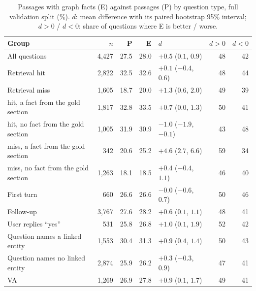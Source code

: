 \begin{table}[ht]
    \centering
    \caption{Passages with graph facts (E) against passages (P) by question type, full
    validation split (\%). $d$: mean difference with its paired bootstrap 95\% interval;
    $d > 0$ / $d < 0$: share of questions where E is better / worse.}
    \label{tab:graphhelp:groups}
    \small
    \begin{tabular}{lrrrlrr}
        \toprule
        Group & $n$ & P & E & $d$ & $d > 0$ & $d < 0$ \\
        \midrule
        All questions                               & 4{,}427 & 27.5 & 28.0 & $+0.5$ ($0.1$, $0.9$)   & 48 & 42 \\
        \midrule
        Retrieval hit                               & 2{,}822 & 32.5 & 32.6 & $+0.1$ ($-0.4$, $0.6$)  & 48 & 44 \\
        Retrieval miss                              & 1{,}605 & 18.7 & 20.0 & $+1.3$ ($0.6$, $2.0$)   & 49 & 39 \\
        \quad hit, a fact from the gold section     & 1{,}817 & 32.8 & 33.5 & $+0.7$ ($0.0$, $1.3$)   & 50 & 41 \\
        \quad hit, no fact from the gold section    & 1{,}005 & 31.9 & 30.9 & $-1.0$ ($-1.9$, $-0.1$) & 43 & 48 \\
        \quad miss, a fact from the gold section    &     342 & 20.6 & 25.2 & $+4.6$ ($2.7$, $6.6$)   & 59 & 34 \\
        \quad miss, no fact from the gold section   & 1{,}263 & 18.1 & 18.5 & $+0.4$ ($-0.4$, $1.1$)  & 46 & 40 \\
        \midrule
        First turn                                  &     660 & 26.6 & 26.6 & $-0.0$ ($-0.6$, $0.7$)  & 50 & 46 \\
        Follow-up                                   & 3{,}767 & 27.6 & 28.2 & $+0.6$ ($0.1$, $1.1$)   & 48 & 41 \\
        User replies ``yes''                        &     531 & 25.8 & 26.8 & $+1.0$ ($0.1$, $1.9$)   & 52 & 42 \\
        Question names a linked entity              & 1{,}553 & 30.4 & 31.3 & $+0.9$ ($0.4$, $1.4$)   & 50 & 43 \\
        Question names no linked entity             & 2{,}874 & 25.9 & 26.2 & $+0.3$ ($-0.3$, $0.9$)  & 47 & 41 \\
        \midrule
        VA                                          & 1{,}269 & 26.9 & 27.8 & $+0.9$ ($0.1$, $1.7$)   & 49 & 41 \\

\end{tabular}
\end{table}

